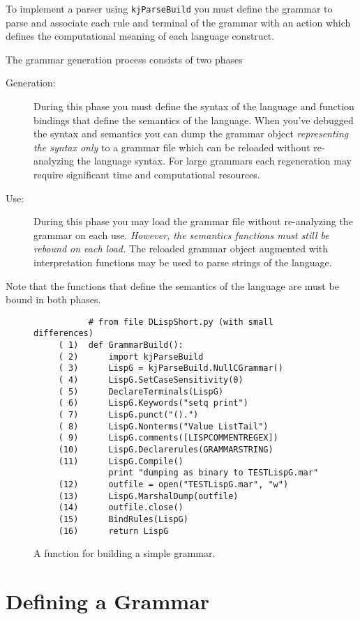 To implement a parser using {\tt kjParseBuild} you must
define the grammar to parse and associate each rule and terminal
of the grammar with an action which defines the
computational meaning of each language construct.

The grammar generation process consists of two phases
\begin{description}
\item[Generation:]
During this phase you must define the syntax of the
language and function bindings that define the semantics
of the language.  When you've debugged the syntax and 
semantics you can dump the grammar object
{\em representing the syntax only} to a grammar file which
can be reloaded without re-analyzing the language syntax.
For large grammars each regeneration may require significant
time and computational resources.
\item[Use:]
During this phase you may load the grammar file without
re-analyzing the grammar on each use. {\em However,
the semantics functions must still be rebound on each
load.}  The reloaded grammar object augmented with interpretation
functions may be used to parse strings of the language.
\end{description}
Note that the functions that define the semantics of the
language are must be bound in both phases.

\begin{figure}
\begin{center}
\begin{verbatim}
           # from file DLispShort.py (with small differences)
     ( 1)  def GrammarBuild():
     ( 2)      import kjParseBuild
     ( 3)      LispG = kjParseBuild.NullCGrammar()
     ( 4)      LispG.SetCaseSensitivity(0) 
     ( 5)      DeclareTerminals(LispG)
     ( 6)      LispG.Keywords("setq print")
     ( 7)      LispG.punct("().")
     ( 8)      LispG.Nonterms("Value ListTail")
     ( 9)      LispG.comments([LISPCOMMENTREGEX])
     (10)      LispG.Declarerules(GRAMMARSTRING)
     (11)      LispG.Compile()
               print "dumping as binary to TESTLispG.mar"
     (12)      outfile = open("TESTLispG.mar", "w")
     (13)      LispG.MarshalDump(outfile)
     (14)      outfile.close()
     (15)      BindRules(LispG)
     (16)      return LispG
\end{verbatim}
\end{center}
\caption{A function for building a simple grammar.\label{GrammarBuild}}
\end{figure}

\section{Defining a Grammar}

